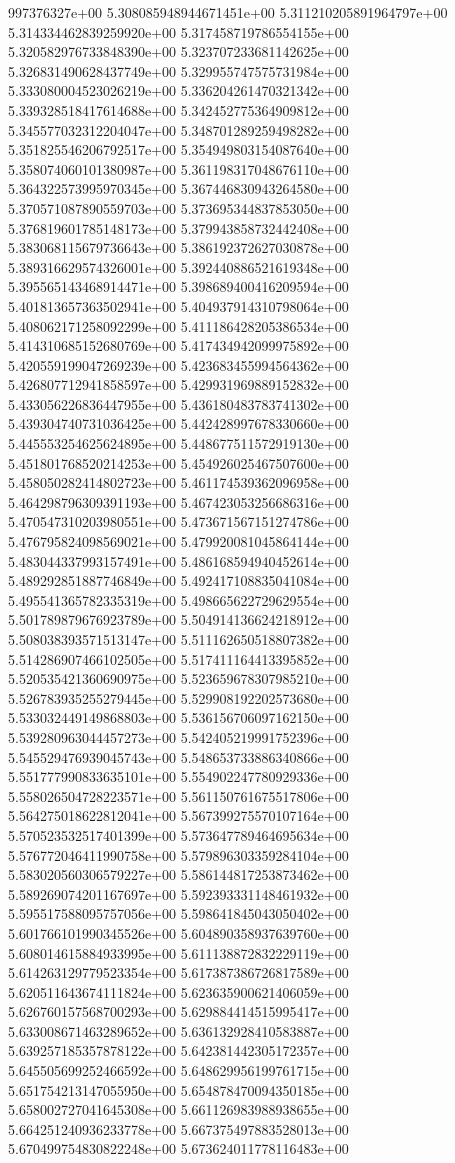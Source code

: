 997376327e+00	5.308085948944671451e+00	5.311210205891964797e+00	5.314334462839259920e+00	5.317458719786554155e+00	5.320582976733848390e+00	5.323707233681142625e+00	5.326831490628437749e+00	5.329955747575731984e+00	5.333080004523026219e+00	5.336204261470321342e+00	5.339328518417614688e+00	5.342452775364909812e+00	5.345577032312204047e+00	5.348701289259498282e+00	5.351825546206792517e+00	5.354949803154087640e+00	5.358074060101380987e+00	5.361198317048676110e+00	5.364322573995970345e+00	5.367446830943264580e+00	5.370571087890559703e+00	5.373695344837853050e+00	5.376819601785148173e+00	5.379943858732442408e+00	5.383068115679736643e+00	5.386192372627030878e+00	5.389316629574326001e+00	5.392440886521619348e+00	5.395565143468914471e+00	5.398689400416209594e+00	5.401813657363502941e+00	5.404937914310798064e+00	5.408062171258092299e+00	5.411186428205386534e+00	5.414310685152680769e+00	5.417434942099975892e+00	5.420559199047269239e+00	5.423683455994564362e+00	5.426807712941858597e+00	5.429931969889152832e+00	5.433056226836447955e+00	5.436180483783741302e+00	5.439304740731036425e+00	5.442428997678330660e+00	5.445553254625624895e+00	5.448677511572919130e+00	5.451801768520214253e+00	5.454926025467507600e+00	5.458050282414802723e+00	5.461174539362096958e+00	5.464298796309391193e+00	5.467423053256686316e+00	5.470547310203980551e+00	5.473671567151274786e+00	5.476795824098569021e+00	5.479920081045864144e+00	5.483044337993157491e+00	5.486168594940452614e+00	5.489292851887746849e+00	5.492417108835041084e+00	5.495541365782335319e+00	5.498665622729629554e+00	5.501789879676923789e+00	5.504914136624218912e+00	5.508038393571513147e+00	5.511162650518807382e+00	5.514286907466102505e+00	5.517411164413395852e+00	5.520535421360690975e+00	5.523659678307985210e+00	5.526783935255279445e+00	5.529908192202573680e+00	5.533032449149868803e+00	5.536156706097162150e+00	5.539280963044457273e+00	5.542405219991752396e+00	5.545529476939045743e+00	5.548653733886340866e+00	5.551777990833635101e+00	5.554902247780929336e+00	5.558026504728223571e+00	5.561150761675517806e+00	5.564275018622812041e+00	5.567399275570107164e+00	5.570523532517401399e+00	5.573647789464695634e+00	5.576772046411990758e+00	5.579896303359284104e+00	5.583020560306579227e+00	5.586144817253873462e+00	5.589269074201167697e+00	5.592393331148461932e+00	5.595517588095757056e+00	5.598641845043050402e+00	5.601766101990345526e+00	5.604890358937639760e+00	5.608014615884933995e+00	5.611138872832229119e+00	5.614263129779523354e+00	5.617387386726817589e+00	5.620511643674111824e+00	5.623635900621406059e+00	5.626760157568700293e+00	5.629884414515995417e+00	5.633008671463289652e+00	5.636132928410583887e+00	5.639257185357878122e+00	5.642381442305172357e+00	5.645505699252466592e+00	5.648629956199761715e+00	5.651754213147055950e+00	5.654878470094350185e+00	5.658002727041645308e+00	5.661126983988938655e+00	5.664251240936233778e+00	5.667375497883528013e+00	5.670499754830822248e+00	5.673624011778116483e+00
